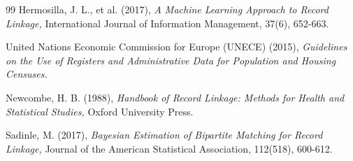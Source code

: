 \documentclass[twoside]{article}
\begin{document}
\begin{thebibliography}{99}
	Hermosilla, J. L., et al. (2017), {\it A Machine Learning Approach to Record Linkage,} International Journal of Information Management, 37(6), 652-663.
	
	United Nations Economic Commission for Europe (UNECE) (2015), {\it Guidelines on the Use of Registers and Administrative Data for Population and Housing Censuses.}
	
	Newcombe, H. B. (1988), {\it Handbook of Record Linkage: Methods for Health and Statistical Studies,} Oxford University Press.
	
	Sadinle, M. (2017), {\it Bayesian Estimation of Bipartite Matching for Record Linkage,} Journal of the American Statistical Association, 112(518), 600-612.
	
\end{thebibliography}


\FloatBarrier
\end{document}
